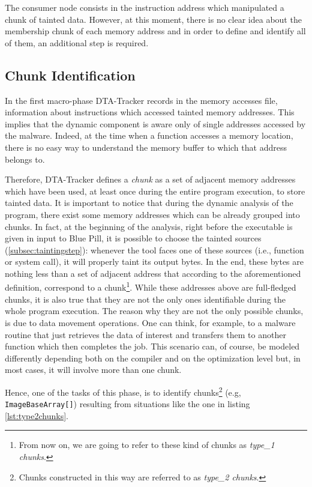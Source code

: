 \documentclass[LaM,binding=0.6cm]{sapthesis}
\begin{document}
The consumer node consists in the instruction address which manipulated a chunk of tainted data. However, at this moment, there is no clear idea about the membership chunk of each memory address and in order to define and identify all of them, an additional step is required.
\subsection{Chunk Identification}
\label{subsec:chunkidentification}
In the first macro-phase DTA-Tracker records in the memory accesses file, information about instructions which accessed tainted memory addresses. This implies that the dynamic component is aware only of single addresses accessed by the malware. Indeed, at the time when a function accesses a memory location, there is no easy way to understand the memory buffer to which that address belongs to.

\smallskip
Therefore, DTA-Tracker defines a \textit{chunk} as a set of adjacent memory addresses which have been used, at least once during the entire program execution, to store tainted data. It is important to notice that during the dynamic analysis of the program, there exist some memory addresses which can be already grouped into chunks. In fact, at the beginning of the analysis, right before the executable is given in input to Blue Pill, it is possible to choose the tainted sources (\autoref{subsec:taintingstep}): whenever the tool faces one of these sources (i.e., function or system call), it will properly taint its output bytes. In the end, these bytes are nothing less than a set of adjacent address that according to the aforementioned definition, correspond to a chunk\footnote{From now on, we are going to refer to these kind of chunks as \textit{type\_1 chunks}.}.
While these addresses above are full-fledged chunks, it is also true that they are not the only ones identifiable during the whole program execution. The reason why they are not the only possible chunks, is due to data movement operations. One can think, for example, to a malware routine that just retrieves the data of interest and transfers them to another function which then completes the job. This scenario can, of course, be modeled differently depending both on the compiler and on the optimization level but, in most cases, it will involve more than one chunk.

Hence, one of the tasks of this phase, is to identify chunks\footnote{Chunks constructed in this way are referred to as \textit{type\_2 chunks}.} (e.g, \texttt{ImageBaseArray[]}) resulting from situations like the one in listing \ref{lst:type2chunks}.
\end{document}
